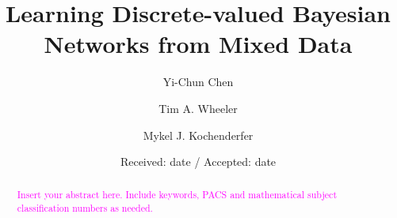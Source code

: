 \newcommand{\discset}{\mathcal{M}}

\DeclareMathOperator*{\argmin}{arg\,min}
\DeclareMathOperator*{\argmax}{arg\,max}

\newcommand{\todo}[1]{\textcolor{magenta}{#1}}
\newcommand{\tim}[1]{\textit{\textcolor{blue}{#1}}}
\newcommand{\mykel}[1]{\textit{\textcolor{cyan}{#1}}}




\title{Learning Discrete-valued Bayesian Networks from Mixed Data%
}


\author{Yi-Chun Chen           \and
        Tim A. Wheeler         \and
        Mykel J. Kochenderfer
}



\date{Received: date / Accepted: date}


\maketitle

\begin{abstract}
\todo{
Insert your abstract here. Include keywords, PACS and mathematical
subject classification numbers as needed.
}
\end{abstract}


